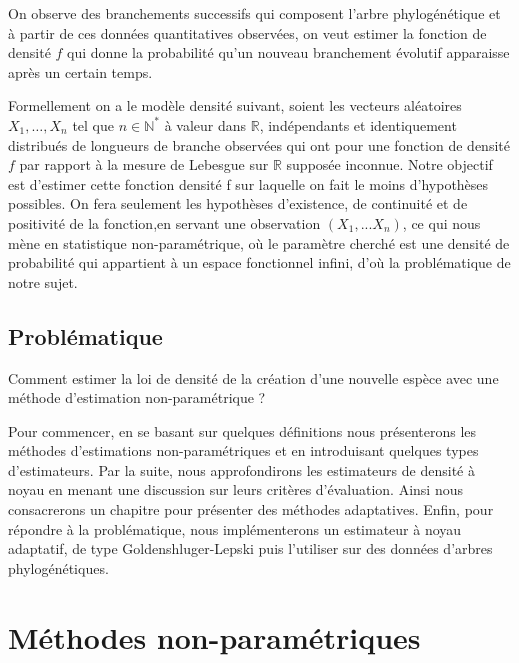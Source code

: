 \documentclass[
]{book}
\begin{document}
\hspace*{0.5cm}

On observe des branchements successifs qui composent l'arbre
phylogénétique et à partir de ces données quantitatives observées, on
veut estimer la fonction de densité \(f\) qui donne la probabilité
qu'un nouveau branchement évolutif apparaisse après un certain temps.

Formellement on a le modèle densité suivant, soient les vecteurs aléatoires \(X_1,\dots,X_n\) tel que \(n \in \mathbb{N^*}\) à valeur dans \(\mathbb{R}\), indépendants et identiquement distribués de longueurs de branche observées qui ont pour
une fonction de densité \(f\) par rapport à la mesure de Lebesgue sur \(\mathbb{R}\) supposée inconnue. Notre objectif est d'estimer cette fonction densité f sur laquelle on fait le moins d'hypothèses possibles. On fera seulement les hypothèses d'existence, de continuité et de positivité de la fonction,en servant une observation \((X_1,...X_n)\), ce qui nous mène en statistique non-paramétrique, où le paramètre cherché est une densité de probabilité qui appartient à un espace fonctionnel infini, d'où la problématique de notre sujet.

\hypertarget{probluxe9matique}{%
\section{Problématique}\label{probluxe9matique}}

Comment estimer la loi de densité de la création d'une nouvelle espèce
avec une méthode d'estimation non-paramétrique ?

Pour commencer, en se basant sur quelques définitions nous présenterons les méthodes d'estimations non-paramétriques et en introduisant quelques types d'estimateurs.\newline
Par la suite, nous approfondirons les estimateurs de densité à noyau en menant une discussion sur leurs critères d'évaluation. Ainsi nous consacrerons un chapitre pour présenter des méthodes adaptatives.\newline
Enfin, pour répondre à la problématique, nous implémenterons un estimateur à noyau adaptatif, de type Goldenshluger-Lepski puis l'utiliser sur des données d'arbres phylogénétiques.

\hypertarget{muxe9thodes-non-paramuxe9triques}{%
\chapter{Méthodes non-paramétriques}\label{muxe9thodes-non-paramuxe9triques}}
\end{document}
